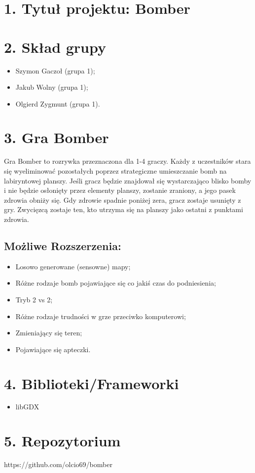 \documentclass{article}
\begin{document}
\section*{1. Tytuł projektu: Bomber}

\section*{2. Skład grupy}
\begin{itemize}
    \item Szymon Gaczoł (grupa 1);
    \item Jakub Wolny (grupa 1);
    \item Olgierd Zygmunt (grupa 1).
\end{itemize}
\section*{3. Gra Bomber}

Gra Bomber to rozrywka przeznaczona dla 1-4 graczy. Każdy z uczestników stara się wyeliminować pozostałych poprzez strategiczne umieszczanie bomb na labiryntowej planszy. Jeśli gracz będzie znajdował się wystarczająco blisko bomby i nie będzie osłonięty przez elementy planszy, zostanie zraniony, a jego pasek zdrowia obniży się. Gdy zdrowie spadnie poniżej zera, gracz zostaje usunięty z gry. Zwycięzcą zostaje ten, kto utrzyma się na planszy jako ostatni z punktami zdrowia.

\subsection*{Możliwe Rozszerzenia:}
\begin{itemize}
    \item Losowo generowane (sensowne) mapy;
    \item Różne rodzaje bomb pojawiające się co jakiś czas do podniesienia;
    \item Tryb 2 vs 2;
    \item Różne rodzaje trudności w grze przeciwko komputerowi;
    \item Zmieniający się teren;
    \item Pojawiające się apteczki.
\end{itemize}

\section*{4. Biblioteki/Frameworki}
\begin{itemize}
    \item libGDX
\end{itemize}
\section*{5. Repozytorium}
https://github.com/olcio69/bomber
\end{document}

